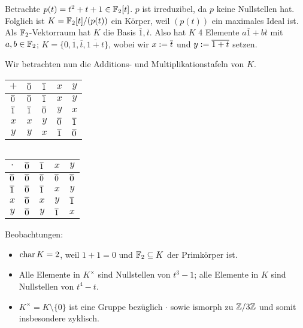 \documentclass[12pt,a4paper]{scrartcl}
\begin{document}
\begin{bsp}
	Betrachte $p(t) = t^2+t+1\in \mathbb F_2[t]$. $p$ ist irreduzibel, da $p$ keine Nullstellen hat. Folglich ist $K = \mathbb F_2[t]/(p(t))$ ein Körper, weil $(p(t))$ ein maximales Ideal ist. Als $\mathbb F_2$-Vektorraum hat $K$ die Basis $\overline{1}, \overline{t}$. Also hat $K$ 4 Elemente $a\overline{1}+b\overline{t}$ mit $a,b\in \mathbb F_2$; $K = \{0,\overline{ 1},\overline{ t}, \overline{1+t}\}$, wobei wir $x := \overline t$ und $y := \overline{1+t}$ setzen.
	
	Wir betrachten nun die Additions- und Multiplikationstafeln von $K$.
	\begin{center}
		\begin{tabular}{c||c|c|c|c}
			$+$ & $\overline 0$ & $\overline 1$ & $x$ & $y$  \\
			\hline \hline
			$\overline 0$ & $\overline 0$ & $\overline 1$ & $x$ & $y$ \\
			\hline
			$\overline 1$ & $\overline 1$ & $\overline 0$ & $y$ & $x$ \\
			\hline
			$x$ & $x$ & $y$ & $\overline 0$ & $\overline 1$ \\
			\hline
			$y$ & $y$ & $x$ & $\overline 1$ & $\overline 0$ \\
		\end{tabular} $\qquad$
		\begin{tabular}{c||c|c|c|c}
			$\cdot$ & $\overline 0$ & $\overline 1$ & $x$ & $y$  \\
			\hline \hline
			$\overline 0$ & $\overline 0$ & $\overline 0$ & $\overline 0$ & $\overline 0$ \\
			\hline
			$\overline 1$ & $\overline 0$ & $\overline 1$ & $x$ & $y$ \\
			\hline
			$x$ & $\overline 0$ & $x$ & $y$ & $\overline 1$ \\
			\hline
			$y$ & $\overline 0$ & $y$ & $\overline 1$ & $x$ \\
		\end{tabular}
	\end{center}
	
	\noindent Beobachtungen:
	\begin{itemize}
		\item $\operatorname{char}{K} = 2$, weil $1+1 = 0$ und $\mathbb F_2\subseteq K$ der Primkörper ist.
		\item Alle Elemente in $K^{\times}$ sind Nullstellen von $t^3-1$; alle Elemente in $K$ sind Nullstellen von $t^4 -t$.
		\item $K^{\times} = K\setminus \{0\}$ ist eine Gruppe bezüglich $\cdot$ sowie ismorph zu $\mathbb Z/3\mathbb Z$ und somit insbesondere zyklisch.
	\end{itemize}
\end{bsp}
\end{document}
